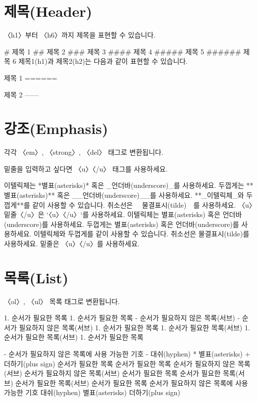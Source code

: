 \documentclass[12pt, a4paper, oneside]{book}
\let\stdsection\section
\renewcommand\section{\newpage\stdsection}
\begin{document}
				\section{제목(Header)}
				〈h1〉부터 〈h6〉까지 제목을 표현할 수 있습니다.
				
				\# 제목 1
				\#\# 제목 2
				\#\#\# 제목 3
				\#\#\#\# 제목 4
				\#\#\#\#\# 제목 5
				\#\#\#\#\#\# 제목 6
				제목1(h1)과 제목2(h2)는 다음과 같이 표현할 수 있습니다.
				
				제목 1
				======
				
				제목 2
				------
						
				\section{강조(Emphasis)}
				
				각각 〈em〉, 〈strong〉, 〈del〉 태그로 변환됩니다.
				
				밑줄을 입력하고 싶다면 〈u〉〈/u〉 태그를 사용하세요.
				
				이텔릭체는 *별표(asterisks)* 혹은 \_언더바(underscore)\_를 사용하세요.
				두껍게는 **별표(asterisks)** 혹은 \_\_언더바(underscore)\_\_를 사용하세요.
				**\_이텔릭체\_와 두껍게**를 같이 사용할 수 있습니다.
				취소선은 ~~물결표시(tilde)~~를 사용하세요.
				〈u〉밑줄〈/u〉은 `〈u〉〈/u〉`를 사용하세요.
				이텔릭체는 별표(asterisks) 혹은 언더바(underscore)를 사용하세요.
				두껍게는 별표(asterisks) 혹은 언더바(underscore)를 사용하세요.
				이텔릭체와 두껍게를 같이 사용할 수 있습니다.
				취소선은 물결표시(tilde)를 사용하세요.
				밑줄은 〈u〉〈/u〉를 사용하세요.
			
				\section{목록(List)}
					
					〈ol〉, 〈ul〉 목록 태그로 변환됩니다.
					
					1. 순서가 필요한 목록
					1. 순서가 필요한 목록
					  - 순서가 필요하지 않은 목록(서브) 
					  - 순서가 필요하지 않은 목록(서브) 
					1. 순서가 필요한 목록
					  1. 순서가 필요한 목록(서브)
					  1. 순서가 필요한 목록(서브)
					1. 순서가 필요한 목록
					
					- 순서가 필요하지 않은 목록에 사용 가능한 기호
					  - 대쉬(hyphen)
					  * 별표(asterisks)
					  + 더하기(plus sign)
					순서가 필요한 목록
					순서가 필요한 목록
					순서가 필요하지 않은 목록(서브)
					순서가 필요하지 않은 목록(서브)
					순서가 필요한 목록
					순서가 필요한 목록(서브)
					순서가 필요한 목록(서브)
					순서가 필요한 목록
					순서가 필요하지 않은 목록에 사용 가능한 기호
					대쉬(hyphen)
					별표(asterisks)
					더하기(plus sign)
			
\end{document}
